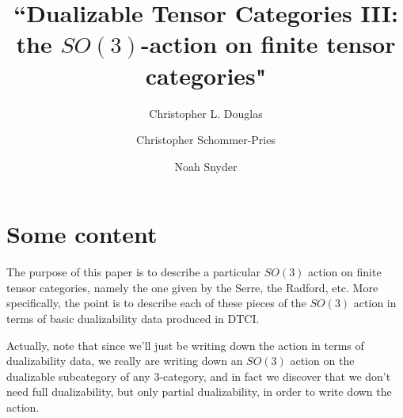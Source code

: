 \documentclass{amsart}
\begin{document}
\title{``Dualizable Tensor Categories III: the $SO(3)$-action on finite tensor categories"}

\author{Christopher L. Douglas}
\address{Mathematical Institute\\ University of Oxford\\ Oxford OX1 3LB\\ United Kingdom}
      	
\author{Christopher Schommer-Pries}
\address{Department of Mathematics\\ Massachusetts Institute of Technology\\ Cambridge, MA 02139\\ USA}

\author{Noah Snyder}
\address{Department of Mathematics\\ Columbia University\\ New York, NY 10027\\ USA}


\maketitle

\tableofcontents

\section{Some content}

The purpose of this paper is to describe a particular $SO(3)$ action on finite tensor categories, namely the one given by the Serre, the Radford, etc.  More specifically, the point is to describe each of these pieces of the $SO(3)$ action in terms of basic dualizability data produced in DTCI.

Actually, note that since we'll just be writing down the action in terms of dualizability data, we really are writing down an $SO(3)$ action on the dualizable subcategory of any 3-category, and in fact we discover that we don't need full dualizability, but only partial dualizability, in order to write down the action.
\end{document}
